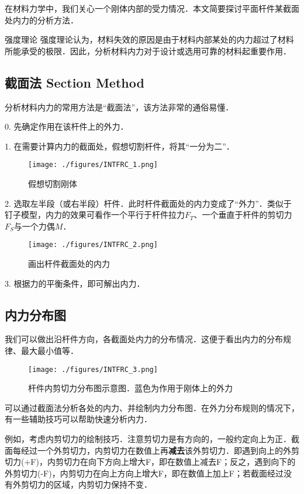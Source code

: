 

在材料力学中，我们关心一个刚体内部的受力情况．本文简要探讨平面杆件某截面处内力的分析方法．

\begin{example}{强度理论}
强度理论认为，材料失效的原因是由于材料内部某处的内力超过了材料所能承受的极限．因此，分析材料内力对于设计或选用可靠的材料起重要作用．
\end{example}

\subsection{截面法 Section Method}
分析材料内力的常用方法是“截面法”，该方法非常的通俗易懂．

0. 先确定作用在该杆件上的外力．

1. 在需要计算内力的截面处，假想切割杆件，将其“一分为二”．
\begin{figure}[ht]
\centering
\texttt{[image: ./figures/INTFRC\_1.png]}
\caption{假想切割刚体} \label{INTFRC_fig1}
\end{figure}

2. 选取左半段（或右半段）杆件．此时杆件截面处的内力变成了“外力”．类似于钉子模型，内力的效果可看作一个平行于杆件拉力$F_T$、一个垂直于杆件的剪切力$F_S$与一个力偶$M$．
\begin{figure}[ht]
\centering
\texttt{[image: ./figures/INTFRC\_2.png]}
\caption{画出杆件截面处的内力} \label{INTFRC_fig2}
\end{figure}

3. 根据力的平衡条件，即可解出内力．

\subsection{内力分布图}
我们可以做出沿杆件方向，各截面处内力的分布情况．这便于看出内力的分布规律、最大最小值等．
\begin{figure}[ht]
\centering
\texttt{[image: ./figures/INTFRC\_3.png]}
\caption{杆件内剪切力分布图示意图．蓝色为作用于刚体上的外力} \label{INTFRC_fig3}
\end{figure}

可以通过截面法分析各处的内力、并绘制内力分布图．在外力分布规则的情况下，有一些辅助技巧可以帮助快速分析内力．

例如，考虑内剪切力的绘制技巧．注意剪切力是有方向的，一般约定向上为正．截面每经过一个外剪切力，内剪切力在数值上再\textbf{减去}该外剪切力．即遇到向上的外剪切力(+F)，内剪切力在向下方向上增大F，即在数值上减去F；反之，遇到向下的外剪切力(-F)，内剪切力在向上方向上增大F，即在数值上加上F；若截面经过没有外剪切力的区域，内剪切力保持不变．
